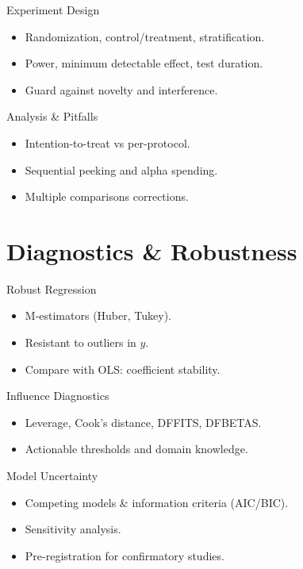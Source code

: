 \documentclass[aspectratio=169]{beamer}
\begin{document}
\begin{frame}{Experiment Design}
\begin{itemize}
  \item Randomization, control/treatment, stratification.
  \item Power, minimum detectable effect, test duration.
  \item Guard against novelty and interference.
\end{itemize}
\end{frame}

\begin{frame}{Analysis \& Pitfalls}
\begin{itemize}
  \item Intention-to-treat vs per-protocol.
  \item Sequential peeking and alpha spending.
  \item Multiple comparisons corrections.
\end{itemize}
\end{frame}

\section{Diagnostics \& Robustness}

\begin{frame}{Robust Regression}
\begin{itemize}
  \item M-estimators (Huber, Tukey).
  \item Resistant to outliers in $y$.
  \item Compare with OLS: coefficient stability.
\end{itemize}
\end{frame}

\begin{frame}{Influence Diagnostics}
\begin{itemize}
  \item Leverage, Cook’s distance, DFFITS, DFBETAS.
  \item Actionable thresholds and domain knowledge.
\end{itemize}
\end{frame}

\begin{frame}{Model Uncertainty}
\begin{itemize}
  \item Competing models \& information criteria (AIC/BIC).
  \item Sensitivity analysis.
  \item Pre-registration for confirmatory studies.
\end{itemize}
\end{frame}
\end{document}
